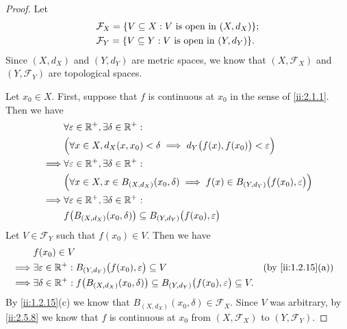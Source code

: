 \begin{proof}
  Let
  \begin{align*}
     & \mathcal{F}_X = \set{V \subseteq X : V \text{ is open in } (X, d_X)}; \\
     & \mathcal{F}_Y = \set{V \subseteq Y : V \text{ is open in } (Y, d_Y)}.
  \end{align*}
  Since \((X, d_X)\) and \((Y, d_Y)\) are metric spaces, we know that \((X, \mathcal{F}_X)\) and \((Y, \mathcal{F}_Y)\) are topological spaces.

  Let \(x_0 \in X\).
  First, suppose that \(f\) is continuous at \(x_0\) in the sense of \cref{ii:2.1.1}.
  Then we have
  \begin{align*}
             & \forall \varepsilon \in \mathbb{R}^+, \exists \delta \in \mathbb{R}^+ :                                                                \\
             & \Big(\forall x \in X, d_X(x, x_0) < \delta \implies d_Y\big(f(x), f(x_0)\big) < \varepsilon\Big)                       \\
    \implies & \forall \varepsilon \in \mathbb{R}^+, \exists \delta \in \mathbb{R}^+ :                                                                \\
             & \Big(\forall x \in X, x \in B_{(X, d_X)}(x_0, \delta) \implies f(x) \in B_{(Y, d_Y)}\big(f(x_0), \varepsilon\big)\Big) \\
    \implies & \forall \varepsilon \in \mathbb{R}^+, \exists \delta \in \mathbb{R}^+ :                                                                \\
             & f\big(B_{(X, d_X)}(x_0, \delta)\big) \subseteq B_{(Y, d_Y)}\big(f(x_0), \varepsilon\big)
  \end{align*}
  Let \(V \in \mathcal{F}_Y\) such that \(f(x_0) \in V\).
  Then we have
  \begin{align*}
             & f(x_0) \in V                                                                                                                                           \\
    \implies & \exists \varepsilon \in \R^+ : B_{(Y, d_Y)}\big(f(x_0), \varepsilon\big) \subseteq V                                            &  & \by{ii:1.2.15}[a] \\
    \implies & \exists \delta \in \R^+ : f\big(B_{(X, d_X)}(x_0, \delta)\big) \subseteq B_{(Y, d_Y)}\big(f(x_0), \varepsilon\big) \subseteq V.
  \end{align*}
  By \cref{ii:1.2.15}(c) we know that \(B_{(X, d_X)}(x_0, \delta) \in \mathcal{F}_X\).
  Since \(V\) was arbitrary, by \cref{ii:2.5.8} we know that \(f\) is continuous at \(x_0\) from \((X, \mathcal{F}_X)\) to \((Y, \mathcal{F}_Y)\).


\end{proof}
